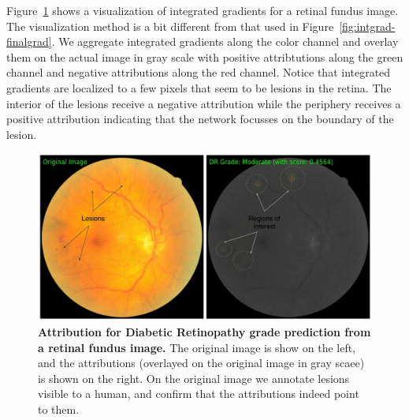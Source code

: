 Figure~\ref{fig:dr} shows a visualization of integrated gradients for
a retinal fundus image. The visualization method is a bit different
from that used in Figure~\ref{fig:intgrad-finalgrad}.
We aggregate integrated gradients along the color channel and
overlay them on the actual image in gray scale with positive
attribtutions along the green channel and negative attributions
along the red channel.
Notice that integrated gradients are localized
to a few pixels that seem to be lesions in the retina. The interior of
the lesions receive a negative attribution while the periphery receives
a positive attribution indicating that the network focusses on the
boundary of the lesion.


\begin{figure}[!htb]
  \centering
  \includegraphics[width=0.8\columnwidth]{./Figures/Retina/retina_with_red.png}
  \caption{\textbf{Attribution for Diabetic Retinopathy grade prediction from a retinal fundus image.}
    The original image is show on the left, and the attributions (overlayed on the
    original image in gray scaee) is shown on the right. On the original image we annotate
    lesions visible to a human, and confirm that the attributions indeed point to them.}\label{fig:dr}
\end{figure}


